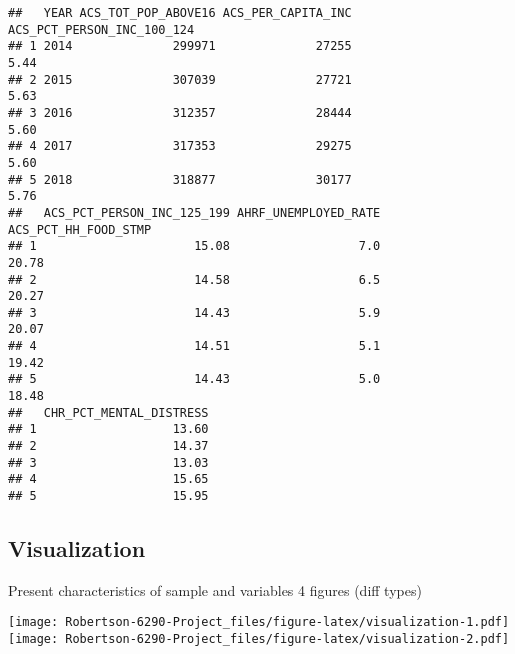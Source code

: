 \documentclass[
]{article}
\newenvironment{Shaded}{\begin{snugshade}}{\end{snugshade}}
\newcommand{\AttributeTok}[1]{\textcolor[rgb]{0.13,0.29,0.53}{#1}}
\newcommand{\ConstantTok}[1]{\textcolor[rgb]{0.56,0.35,0.01}{#1}}
\newcommand{\FunctionTok}[1]{\textcolor[rgb]{0.13,0.29,0.53}{\textbf{#1}}}
\newcommand{\NormalTok}[1]{#1}
\newcommand{\SpecialCharTok}[1]{\textcolor[rgb]{0.81,0.36,0.00}{\textbf{#1}}}
\begin{document}
\begin{verbatim}
##   YEAR ACS_TOT_POP_ABOVE16 ACS_PER_CAPITA_INC ACS_PCT_PERSON_INC_100_124
## 1 2014              299971              27255                       5.44
## 2 2015              307039              27721                       5.63
## 3 2016              312357              28444                       5.60
## 4 2017              317353              29275                       5.60
## 5 2018              318877              30177                       5.76
##   ACS_PCT_PERSON_INC_125_199 AHRF_UNEMPLOYED_RATE ACS_PCT_HH_FOOD_STMP
## 1                      15.08                  7.0                20.78
## 2                      14.58                  6.5                20.27
## 3                      14.43                  5.9                20.07
## 4                      14.51                  5.1                19.42
## 5                      14.43                  5.0                18.48
##   CHR_PCT_MENTAL_DISTRESS
## 1                   13.60
## 2                   14.37
## 3                   13.03
## 4                   15.65
## 5                   15.95
\end{verbatim}

\begin{Shaded}
\end{Shaded}

\hypertarget{visualization}{%
\subsection{Visualization}\label{visualization}}

Present characteristics of sample and variables 4 figures (diff types)

\texttt{[image: Robertson-6290-Project\_files/figure-latex/visualization-1.pdf]}
\texttt{[image: Robertson-6290-Project\_files/figure-latex/visualization-2.pdf]}
\end{document}
